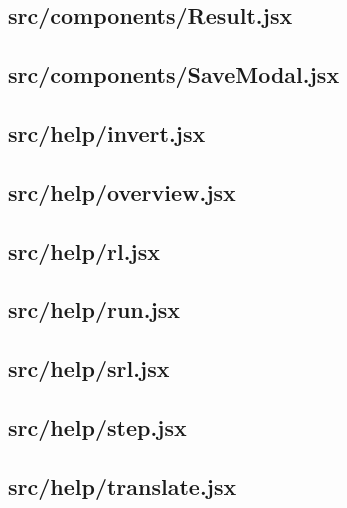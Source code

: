 \subsection{src/components/Result.jsx}
\label{app:client_src_components_Result_jsx}

\subsection{src/components/SaveModal.jsx}
\label{app:client_src_components_SaveModal_jsx}

\subsection{src/help/invert.jsx}
\label{app:client_src_help_invert_jsx}

\subsection{src/help/overview.jsx}
\label{app:client_src_help_overview_jsx}

\subsection{src/help/rl.jsx}
\label{app:client_src_help_rl_jsx}

\subsection{src/help/run.jsx}
\label{app:client_src_help_run_jsx}

\subsection{src/help/srl.jsx}
\label{app:client_src_help_srl_jsx}

\subsection{src/help/step.jsx}
\label{app:client_src_help_step_jsx}

\subsection{src/help/translate.jsx}
\label{app:client_src_help_translate_jsx}

